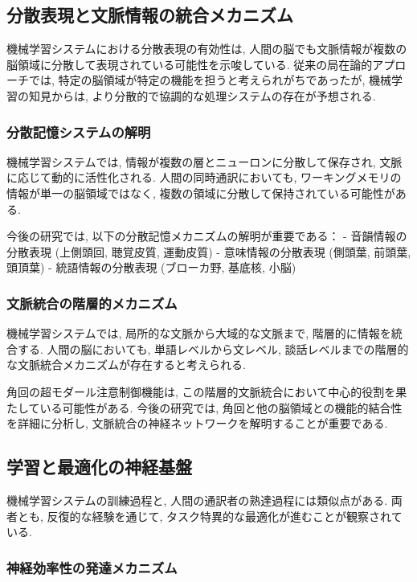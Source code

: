 \subsection{分散表現と文脈情報の統合メカニズム}

機械学習システムにおける分散表現の有効性は, 人間の脳でも文脈情報が複数の脳領域に分散して表現されている可能性を示唆している.
従来の局在論的アプローチでは, 特定の脳領域が特定の機能を担うと考えられがちであったが, 機械学習の知見からは, より分散的で協調的な処理システムの存在が予想される.

\subsubsection{分散記憶システムの解明}

機械学習システムでは, 情報が複数の層とニューロンに分散して保存され, 文脈に応じて動的に活性化される.
人間の同時通訳においても, ワーキングメモリの情報が単一の脳領域ではなく, 複数の領域に分散して保持されている可能性がある.

今後の研究では, 以下の分散記憶メカニズムの解明が重要である：
- 音韻情報の分散表現 (上側頭回, 聴覚皮質, 運動皮質)
- 意味情報の分散表現 (側頭葉, 前頭葉, 頭頂葉)
- 統語情報の分散表現 (ブローカ野, 基底核, 小脳)

\subsubsection{文脈統合の階層的メカニズム}

機械学習システムでは, 局所的な文脈から大域的な文脈まで, 階層的に情報を統合する.
人間の脳においても, 単語レベルから文レベル, 談話レベルまでの階層的な文脈統合メカニズムが存在すると考えられる.

角回の超モダール注意制御機能は, この階層的文脈統合において中心的役割を果たしている可能性がある.
今後の研究では, 角回と他の脳領域との機能的結合性を詳細に分析し, 文脈統合の神経ネットワークを解明することが重要である.

\subsection{学習と最適化の神経基盤}

機械学習システムの訓練過程と, 人間の通訳者の熟達過程には類似点がある.
両者とも, 反復的な経験を通じて, タスク特異的な最適化が進むことが観察されている.

\subsubsection{神経効率性の発達メカニズム}

